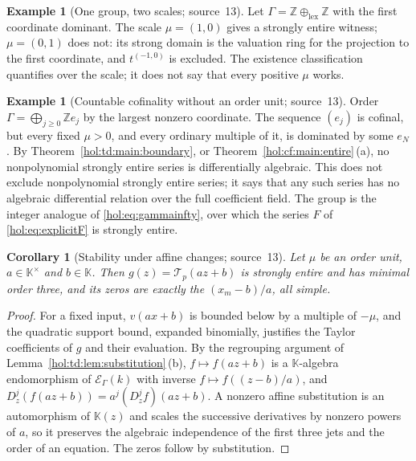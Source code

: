 \documentclass[11pt]{article}
\numberwithin{equation}{section}
\newtheorem{corollary}[theorem]{Corollary}
\theoremstyle{definition}
\newtheorem{example}[theorem]{Example}
\theoremstyle{remark}
\newcommand{\Z}{\mathbb Z}
\newcommand{\KK}{\mathbb K}
\newcommand{\EK}{\mathcal E_\Gamma(k)}
\begin{document}
\begin{example}[One group, two scales; source~13]\label{hol:td:ex:lex}
Let $\Gamma=\Z\oplus_{\mathrm{lex}}\Z$ with the first coordinate dominant.
The scale $\mu=(1,0)$ gives a strongly entire witness; $\mu=(0,1)$ does not:
its strong domain is the valuation ring for the projection to the first
coordinate, and $t^{(-1,0)}$ is excluded. The existence classification
quantifies over the scale; it does not say that every positive $\mu$ works.
\end{example}

\begin{example}[Countable cofinality without an order unit; source~13]
\label{hol:td:ex:cofinality}
Order $\Gamma=\bigoplus_{j\ge0}\Z e_j$ by the largest nonzero coordinate. The
sequence $(e_j)$ is cofinal, but every fixed $\mu>0$, and every ordinary
multiple of it, is dominated by some $e_N$. By
Theorem~\ref{hol:td:main:boundary}, or Theorem~\ref{hol:cf:main:entire}\,(a),
no nonpolynomial strongly entire series is differentially algebraic. This
does not exclude nonpolynomial strongly entire series; it says that any such
series has no algebraic differential relation over the full coefficient field.
The group is the integer analogue of \eqref{hol:eq:gammainfty}, over which the
series $F$ of \eqref{hol:eq:explicitF} is strongly entire.
\end{example}

\begin{corollary}[Stability under affine changes; source~13]
\label{hol:td:cor:affine}
Let $\mu$ be an order unit, $a\in\KK^\times$ and $b\in\KK$. Then
$g(z)=\mathcal T_p(az+b)$ is strongly entire and has minimal order three, and
its zeros are exactly the $(x_m-b)/a$, all simple.
\end{corollary}

\begin{proof}
For a fixed input, $v(ax+b)$ is bounded below by a multiple of $-\mu$, and the
quadratic support bound, expanded binomially, justifies the Taylor
coefficients of $g$ and their evaluation. By the regrouping argument of
Lemma~\ref{hol:td:lem:substitution}\,(b), $f\mapsto f(az+b)$ is a
$\KK$-algebra endomorphism of $\EK$ with inverse $f\mapsto f((z-b)/a)$, and
$D_z^j(f(az+b))=a^j(D_z^jf)(az+b)$. A nonzero affine substitution is an
automorphism of $\KK(z)$ and scales the successive derivatives by nonzero
powers of $a$, so it preserves the algebraic independence of the first three
jets and the order of an equation. The zeros follow by substitution.
\end{proof}
\end{document}
